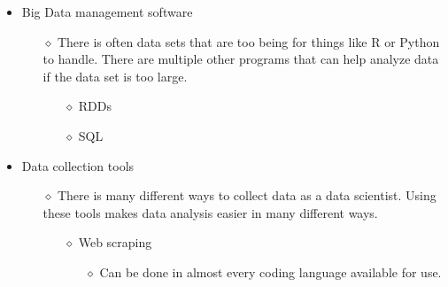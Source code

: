 \documentclass[11pt,letterpaper]{article}
\begin{document}
\begin{itemize}
\begin{itemize}
\begin{itemize}
            \end{itemize}
        \end{itemize}
    \item Big Data management software
        \begin{itemize}
            \item[$\diamond$] There is often data sets that are too being for things like R or Python to handle. There are multiple other programs that can help analyze data if the data set is too large.
                \begin{itemize}
                    \item[$\diamond$] RDDs
                    \item[$\diamond$] SQL
                \end{itemize}
        \end{itemize}
    \item Data collection tools
        \begin{itemize}
            \item[$\diamond$] There is many different ways to collect data as a data scientist. Using these tools makes data analysis easier in many different ways. 
                \begin{itemize}
                    \item[$\diamond$] Web scraping
                \begin{itemize}
                    \item[$\diamond$] Can be done in almost every coding language available for use. 
                \end{itemize}
                \end{itemize}
        \end{itemize}
        \end{itemize}
\end{document}
